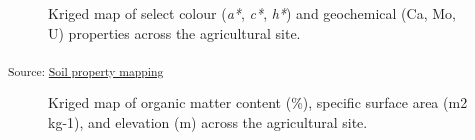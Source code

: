 \documentclass[
  number]{elsarticle}
\begin{document}
\begin{figure}[H]


\caption{\label{fig-ag_map}Kriged map of select colour (\emph{a*},
\emph{c*}, \emph{h*}) and geochemical (Ca, Mo, U) properties across the
agricultural site.}

\end{figure}%

\textsubscript{Source:
\href{https://alex-koiter.github.io/spatial-variability-soil-manuscript/notebooks/soil_property_maps.qmd.html\#cell-fig-ag_map}{Soil
property mapping}}

\begin{figure}[H]


\caption{\label{fig-ag_map2}Kriged map of organic matter content (\%),
specific surface area (m2 kg-1), and elevation (m) across the
agricultural site.}

\end{figure}%
\end{document}
